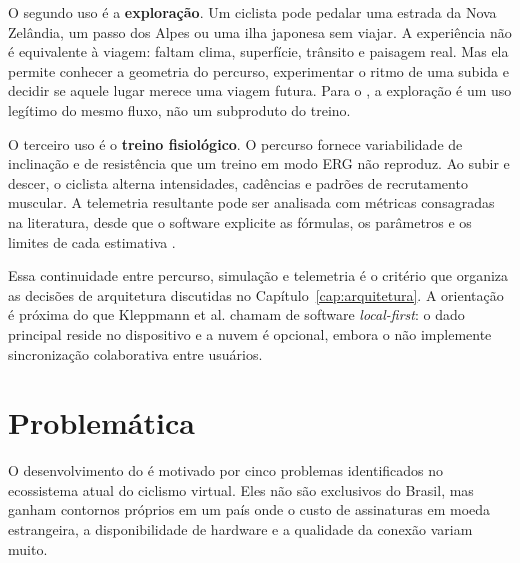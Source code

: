 O segundo uso é a \textbf{exploração}. Um ciclista pode pedalar uma estrada da
Nova Zelândia, um passo dos Alpes ou uma ilha japonesa sem viajar. A experiência
não é equivalente à viagem: faltam clima, superfície, trânsito e paisagem real.
Mas ela permite conhecer a geometria do percurso, experimentar o ritmo de uma
subida e decidir se aquele lugar merece uma viagem futura. Para o \argus{}, a
exploração é um uso legítimo do mesmo fluxo, não um subproduto do treino.

O terceiro uso é o \textbf{treino fisiológico}. O percurso fornece variabilidade
de inclinação e de resistência que um treino em modo ERG não reproduz. Ao subir
e descer, o ciclista alterna intensidades, cadências e padrões de recrutamento
muscular. A telemetria resultante pode ser analisada com métricas consagradas
na literatura, desde que o software explicite as fórmulas, os parâmetros e os
limites de cada estimativa \cite{coggan2010}.

Essa continuidade entre percurso, simulação e telemetria é o critério que
organiza as decisões de arquitetura discutidas no
Capítulo~\ref{cap:arquitetura}. A orientação é próxima do que
Kleppmann et al. \cite{kleppmann2019} chamam de software \textit{local-first}:
o dado principal reside no dispositivo e a nuvem é opcional, embora o \argus{}
não implemente sincronização colaborativa entre usuários.

\section{Problemática}
\label{sec:problematica}

O desenvolvimento do \argus{} é motivado por cinco problemas identificados no
ecossistema atual do ciclismo virtual. Eles não são exclusivos do Brasil, mas
ganham contornos próprios em um país onde o custo de assinaturas em moeda
estrangeira, a disponibilidade de hardware e a qualidade da conexão variam
muito.

